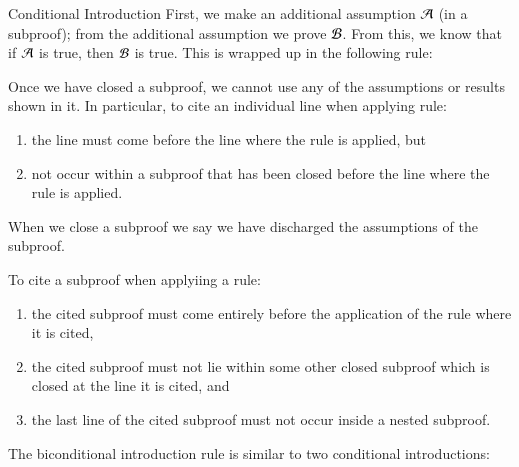 \documentclass[12pt, a4paper, oneside, openright, titlepage]{book}
\begin{document}
\begin{defn}{Conditional Introduction}
    First, we make an additional assumption $\mathcal{A}$ (in a subproof); from the additional assumption we prove $\mathcal{B}$. From this, we know that if $\mathcal{A}$ is true, then $\mathcal{B}$ is true. This is wrapped up in the following rule: \begin{fitchproof}
        \open
                \close
    \end{fitchproof}
\end{defn}


\begin{rmk}
    Once we have closed a subproof, we cannot use any of the assumptions or results shown in it. In particular, to cite an individual line when applying rule: \begin{enumerate}
        \item the line must come before the line where the rule is applied, but
        \item not occur within a subproof that has been closed before the line where the rule is applied.
    \end{enumerate}
    When we close a subproof we say we have discharged the assumptions of the subproof.
\end{rmk}


\begin{rmk}
    To cite a subproof when applyiing a rule: \begin{enumerate}
        \item the cited subproof must come entirely before the application of the rule where it is cited,
        \item the cited subproof must not lie within some other closed subproof which is closed at the line it is cited, and 
        \item the last line of the cited subproof must not occur inside a nested subproof.
    \end{enumerate}
\end{rmk}

\begin{defn}
    The biconditional introduction rule is similar to two conditional introductions: \begin{fitchproof}
        \open
        \close
        \open 
        \close
         
    \end{fitchproof}
\end{defn}
\end{document}

